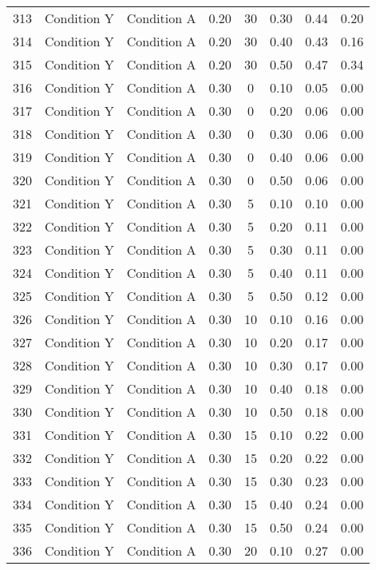\begin{landscape}
\begin{longtable}{cc cc cc cc}
  313 & Condition Y & Condition A & 0.20 &  30 & 0.30 & 0.44 & 0.20 \\ 
  314 & Condition Y & Condition A & 0.20 &  30 & 0.40 & 0.43 & 0.16 \\ 
  315 & Condition Y & Condition A & 0.20 &  30 & 0.50 & 0.47 & 0.34 \\ 
  316 & Condition Y & Condition A & 0.30 &   0 & 0.10 & 0.05 & 0.00 \\ 
  317 & Condition Y & Condition A & 0.30 &   0 & 0.20 & 0.06 & 0.00 \\ 
  318 & Condition Y & Condition A & 0.30 &   0 & 0.30 & 0.06 & 0.00 \\ 
  319 & Condition Y & Condition A & 0.30 &   0 & 0.40 & 0.06 & 0.00 \\ 
  320 & Condition Y & Condition A & 0.30 &   0 & 0.50 & 0.06 & 0.00 \\ 
  321 & Condition Y & Condition A & 0.30 &   5 & 0.10 & 0.10 & 0.00 \\ 
  322 & Condition Y & Condition A & 0.30 &   5 & 0.20 & 0.11 & 0.00 \\ 
  323 & Condition Y & Condition A & 0.30 &   5 & 0.30 & 0.11 & 0.00 \\ 
  324 & Condition Y & Condition A & 0.30 &   5 & 0.40 & 0.11 & 0.00 \\ 
  325 & Condition Y & Condition A & 0.30 &   5 & 0.50 & 0.12 & 0.00 \\ 
  326 & Condition Y & Condition A & 0.30 &  10 & 0.10 & 0.16 & 0.00 \\ 
  327 & Condition Y & Condition A & 0.30 &  10 & 0.20 & 0.17 & 0.00 \\ 
  328 & Condition Y & Condition A & 0.30 &  10 & 0.30 & 0.17 & 0.00 \\ 
  329 & Condition Y & Condition A & 0.30 &  10 & 0.40 & 0.18 & 0.00 \\ 
  330 & Condition Y & Condition A & 0.30 &  10 & 0.50 & 0.18 & 0.00 \\ 
  331 & Condition Y & Condition A & 0.30 &  15 & 0.10 & 0.22 & 0.00 \\ 
  332 & Condition Y & Condition A & 0.30 &  15 & 0.20 & 0.22 & 0.00 \\ 
  333 & Condition Y & Condition A & 0.30 &  15 & 0.30 & 0.23 & 0.00 \\ 
  334 & Condition Y & Condition A & 0.30 &  15 & 0.40 & 0.24 & 0.00 \\ 
  335 & Condition Y & Condition A & 0.30 &  15 & 0.50 & 0.24 & 0.00 \\ 
  336 & Condition Y & Condition A & 0.30 &  20 & 0.10 & 0.27 & 0.00 \\ 

\end{longtable}
\end{landscape}
